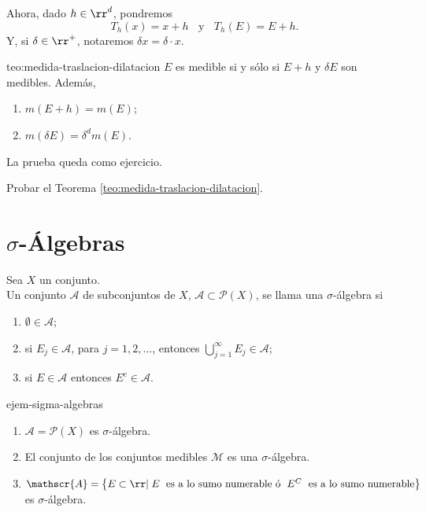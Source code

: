 Ahora, dado $h\in \rr^d$, pondremos
\[
T_h(x)=x+h\;\;\mbox{ y }\;\; T_h(E)=E+h.
\]
Y, si $\delta \in \rr^+$, notaremos $\delta x=\delta \cdot x$.

\begin{teorema}{teo:medida-traslacion-dilatacion}
$E$ es medible si y s\'olo si $E+h$  y $\delta E$ son medibles.
Adem\'as, 
\begin{enumerate}
    \item $m(E+h)=m(E)$;
    \item $m(\delta E)=\delta^d m(E)$.
\end{enumerate}
\end{teorema}

\begin{demo}
La prueba queda como ejercicio.
\end{demo}

\begin{ejercicio}{}
Probar el Teorema \ref{teo:medida-traslacion-dilatacion}.
\end{ejercicio}

\section{$\sigma$-\'Algebras}

\begin{definicion}{}
Sea $X$ un conjunto. 
\\
Un conjunto $\mathscr{A}$ de subconjuntos de $X$, 
$\mathscr{A}\subset \mathscr{P}(X)$, se llama una $\sigma$-\'algebra si \begin{enumerate}
    \item $\emptyset \in \mathscr{A}$;
    \item si $E_j\in \mathscr{A}$, para $j=1,2,\ldots$, entonces
    $\bigcup\limits_{j=1}^{\infty} E_j \in \mathscr{A}$;
    \item si $E\in \mathscr{A}$ entonces $E^c \in \mathscr{A}$.
\end{enumerate}
\end{definicion}


\begin{ejemplo}{ejem-sigma-algebras}
\begin{enumerate}
    \item $\mathscr{A}=\mathscr{P}(X)$ es $\sigma$-\'algebra.
    \item El conjunto de los conjuntos medibles $\mathscr{M}$ es una $\sigma$-\'algebra.
    \item\label{it:sigma-algebra-cjto-a-lo-s-numerable} $\mathscr{A}=\left\{E\subset \rr| \;E \;\mbox{ es a lo sumo numerable \'o } \; E^C \;\mbox{ es a lo sumo numerable}  \right\}$
    es $\sigma$-\'algebra.
\end{enumerate}
\end{ejemplo}



